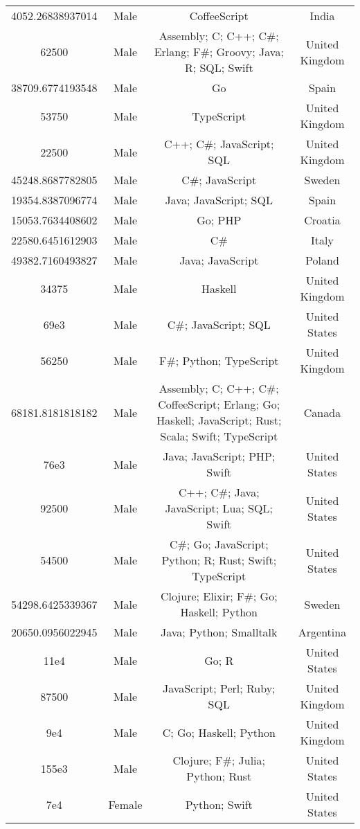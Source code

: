 \begin{center}
\begin{tabular}{ |c|c|c|c| }
4052.26838937014  &  Male  &  CoffeeScript  &  India  \\ 
62500  &  Male  &  Assembly; C; C++; C\#; Erlang; F\#; Groovy; Java; R; SQL; Swift  &  United Kingdom  \\ 
38709.6774193548  &  Male  &  Go  &  Spain  \\ 
53750  &  Male  &  TypeScript  &  United Kingdom  \\ 
22500  &  Male  &  C++; C\#; JavaScript; SQL  &  United Kingdom  \\ 
45248.8687782805  &  Male  &  C\#; JavaScript  &  Sweden  \\ 
19354.8387096774  &  Male  &  Java; JavaScript; SQL  &  Spain  \\ 
15053.7634408602  &  Male  &  Go; PHP  &  Croatia  \\ 
22580.6451612903  &  Male  &  C\#  &  Italy  \\ 
49382.7160493827  &  Male  &  Java; JavaScript  &  Poland  \\ 
34375  &  Male  &  Haskell  &  United Kingdom  \\ 
69e3  &  Male  &  C\#; JavaScript; SQL  &  United States  \\ 
56250  &  Male  &  F\#; Python; TypeScript  &  United Kingdom  \\ 
68181.8181818182  &  Male  &  Assembly; C; C++; C\#; CoffeeScript; Erlang; Go; Haskell; JavaScript; Rust; Scala; Swift; TypeScript  &  Canada  \\ 
76e3  &  Male  &  Java; JavaScript; PHP; Swift  &  United States  \\ 
92500  &  Male  &  C++; C\#; Java; JavaScript; Lua; SQL; Swift  &  United States  \\ 
54500  &  Male  &  C\#; Go; JavaScript; Python; R; Rust; Swift; TypeScript  &  United States  \\ 
54298.6425339367  &  Male  &  Clojure; Elixir; F\#; Go; Haskell; Python  &  Sweden  \\ 
20650.0956022945  &  Male  &  Java; Python; Smalltalk  &  Argentina  \\ 
11e4  &  Male  &  Go; R  &  United States  \\ 
87500  &  Male  &  JavaScript; Perl; Ruby; SQL  &  United Kingdom  \\ 
9e4  &  Male  &  C; Go; Haskell; Python  &  United Kingdom  \\ 
155e3  &  Male  &  Clojure; F\#; Julia; Python; Rust  &  United States  \\ 
7e4  &  Female  &  Python; Swift  &  United States  \\ 

\end{tabular}
\end{center}
